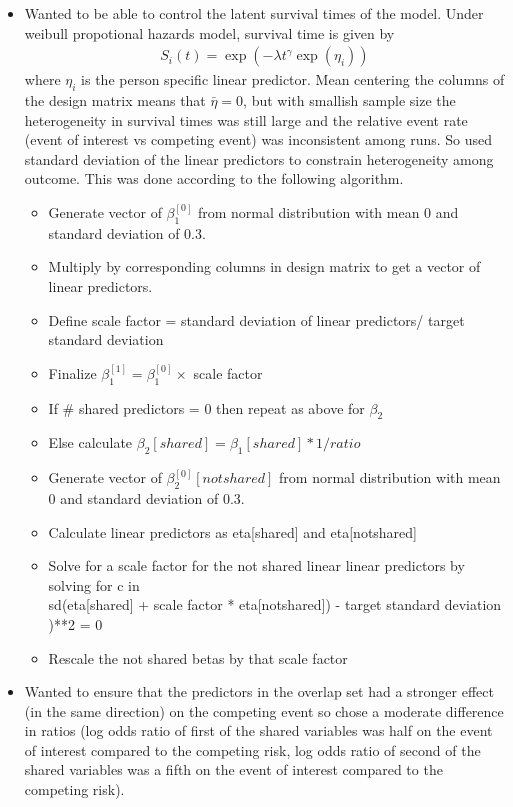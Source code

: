 \documentclass[11pt,a4paper]{article}
\begin{document}
\begin{itemize}
\begin{itemize}
    \item Wanted to be able to control the latent survival times of the model. Under weibull propotional hazards model, survival time is given by 
    \begin{align*}
        S_i(t) = \exp(-\lambda t^{\gamma}\exp(\eta_i))
    \end{align*}
    where $\eta_i$ is the person specific linear predictor. Mean centering the columns of the design matrix means that $\bar{\eta}=0$, but with smallish sample size the heterogeneity in survival times was still large and the relative event rate (event of interest vs competing event) was inconsistent among runs. So used standard deviation of the linear predictors to constrain heterogeneity among outcome. This was done according to the following algorithm.
    \begin{itemize}
        \item Generate vector of $\beta^{[0]}_1$ from normal distribution with mean 0 and standard deviation of 0.3.
        \item Multiply by corresponding columns in design matrix to get a vector of linear predictors.
        \item Define scale factor = standard deviation of linear predictors/ target standard deviation
        \item Finalize $\beta^{[1]}_1 = \beta^{[0]}_1 \times$ scale factor
        \item If \# shared predictors = 0 then repeat as above for $\beta_2$
        \item Else calculate $\beta_2[shared] = \beta_1[shared]*1/ratio$
        \item Generate vector of $\beta^{[0]}_2[not shared]$ from normal distribution with mean 0 and standard deviation of 0.3.
        \item Calculate linear predictors as eta[shared] and eta[notshared]
        \item Solve for a scale factor for the not shared linear linear predictors by solving for c in \\ sd(eta[shared] + scale factor * eta[notshared]) - target standard deviation )**2 = 0
        \item Rescale the not shared betas by that scale factor
    \end{itemize}
    \item Wanted to ensure that the predictors in the overlap set had a stronger effect (in the same direction) on the competing event so chose a moderate difference in ratios (log odds ratio of first of the shared variables was half on the event of interest compared to the competing risk, log odds ratio of second of the shared variables was a fifth  on the event of interest compared to the competing risk).

\end{itemize}
\end{itemize}
\end{document}

